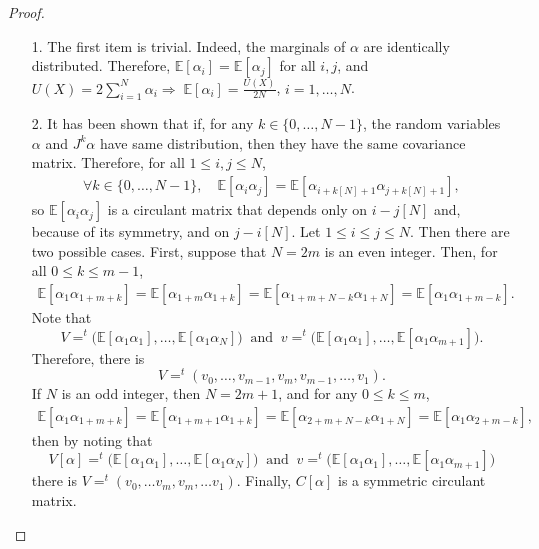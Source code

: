 \documentclass[numbers,compress,v1.0.1]{vmsta}
\theoremstyle{definition}
\begin{document}
\begin{proof}
$\:$
%
\begin{enumerate}
%
\item[1.] The first item is trivial. Indeed, the marginals of $\alpha$
are identically distributed. Therefore, $\mathbb{E}[\alpha_i]=\mathbb
{E}[\alpha_j]$ for all $i,j$, and $U(X)=2\sum_{i=1}^N \alpha
_i\Rightarrow\;\mathbb{E}[\alpha_i]=\frac{U(X)}{2N}$, $i=1,\dots,N$.
%
\item[2.] It has been shown that if, for any $k\in\lbrace0,\dots
,N-1\rbrace$, the random variables $\alpha$ and $J^k\alpha$ have same
distribution, then they have the same covariance matrix. Therefore, for
all $1\leq i,j\leq N$,
%
\begin{align*}
\forall k\in\lbrace0,\dots,N-1\rbrace,\quad  \mathbb{E}[\alpha_i\alpha
_j]=\mathbb{E}[\alpha_{i+k[N]+1}\alpha_{j+k[N]+1}],
\end{align*}
%
so $\mathbb{E}[\alpha_i\alpha_j]$ is a circulant matrix that depends
only on $i-j[N]$ and, because of its symmetry, and on $ j-i[N]$. Let
$1\leq i\leq j\leq N$. Then there are two possible cases. First,
suppose that $N=2m$ is an even integer. Then, for all $ 0\leq k\leq m-1$,
%
\begin{align*}
\mathbb{E}[\alpha_1\alpha_{1+m+k}]=\mathbb{E}[
\alpha_{1+m}\alpha _{1+k}]=\mathbb{E}[\alpha_{1+m+N-k}
\alpha_{1+N}]=\mathbb{E}[\alpha _{1}\alpha_{1+m-k}].
\end{align*}
%
Note that
%
\[
V=^t\bigl(\mathbb{E}[\alpha_1\alpha_1],
\dots,\mathbb{E}[\alpha_1\alpha_N]\bigr) \ \mbox{ and }\
v=^t\bigl(\mathbb{E}[\alpha_1\alpha_1],
\dots,\mathbb {E}[\alpha_1\alpha_{m+1 }]\bigr).
\]
%
Therefore, there is
%
\[
V=^t(v_0,\dots,v_{m-1},v_{m},v_{m-1},
\dots,v_1).
\]
%
If $N$ is an odd integer, then $N=2m+1$, and for any $0\leq k\leq m$,
%
\begin{align*}
\mathbb{E}[\alpha_1\alpha_{1+m+k}]=\mathbb{E}[
\alpha_{1+m+1}\alpha _{1+k}]=\mathbb{E}[\alpha_{2+m+N-k}
\alpha_{1+N}]=\mathbb{E}[\alpha _{1}\alpha_{2+m-k}],
\end{align*}
%
then by noting that
%
\[
V[\alpha]=^t\bigl(\mathbb{E}[\alpha_1
\alpha_1],\dots,\mathbb{E}[\alpha _1
\alpha_N]\bigr) \ \mbox{ and }\ v=^t\bigl(\mathbb{E}[
\alpha_1\alpha_1],\dots, \mathbb{E}[
\alpha_1\alpha_{m+1 }]\bigr)
\]
%
there is $V=^t(v_0,\ldots v_m,v_{m},\ldots v_1)$. Finally, $C[\alpha]$
is a symmetric circulant matrix.\qedhere
\end{enumerate}
\end{proof}
\end{document}
